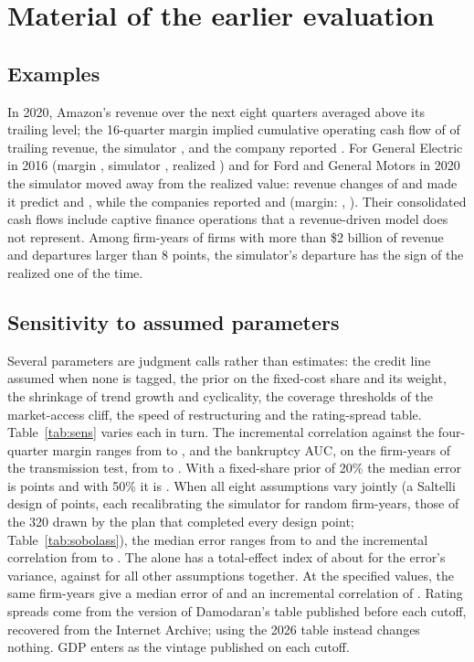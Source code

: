 \section{Material of the earlier evaluation}\label{app:online}

\subsection{Examples}\label{app:examples}
In 2020, Amazon's revenue over the next eight quarters averaged \ExAmznRev{} above its trailing level; the 16-quarter margin implied cumulative operating cash flow of \ExAmznRule{} of trailing revenue, the simulator \ExAmznTwin, and the company reported \ExAmznReal. For General Electric in 2016 (margin \ExGeRule, simulator \ExGeTwin, realized \ExGeReal) and for Ford and General Motors in 2020 the simulator moved away from the realized value: revenue changes of \ExFordRev{} and \ExGmRev{} made it predict \ExFordTwin{} and \ExGmTwin{}, while the companies reported \ExFordReal{} and \ExGmReal{} (margin: \ExFordRule, \ExGmRule). Their consolidated cash flows include captive finance operations that a revenue-driven model does not represent. Among firm-years of firms with more than \$2 billion of revenue and departures larger than 8 points, the simulator's departure has the sign of the realized one \ExRightSign{} of the time.

\subsection{Sensitivity to assumed parameters}
Several parameters are judgment calls rather than estimates: the credit line assumed when none is tagged, the prior on the fixed-cost share and its weight, the shrinkage of trend growth and cyclicality, the coverage thresholds of the market-access cliff, the speed of restructuring and the rating-spread table. Table~\ref{tab:sens} varies each in turn. The incremental correlation against the four-quarter margin ranges from \SensIncrLo{} to \SensIncrHi, and the bankruptcy AUC, on the firm-years of the transmission test, from \SensBkLo{} to \SensBkHi. With a fixed-share prior of 20\% the median error is \SensMaeLow{} points and with 50\% it is \SensMaeHigh. When all eight assumptions vary jointly (a Saltelli design of \SobPoints{} points, each recalibrating the simulator for \SobN{} random firm-years, those of the 320 drawn by the plan that completed every design point; Table~\ref{tab:sobolass}), the median error ranges from \SobMaeMin{} to \SobMaeMax{} and the incremental correlation from \SobIncrMin{} to \SobIncrMax{}. The \SobTopLabel{} alone has a total-effect index of about \SobTopST{} for the error's variance, against \SobRestST{} for all other assumptions together. At the specified values, the same firm-years give a median error of \SobSpecMae{} and an incremental correlation of \SobSpecIncr. Rating spreads come from the version of Damodaran's table published before each cutoff, recovered from the Internet Archive; using the 2026 table instead changes nothing. GDP enters as the vintage published on each cutoff.

